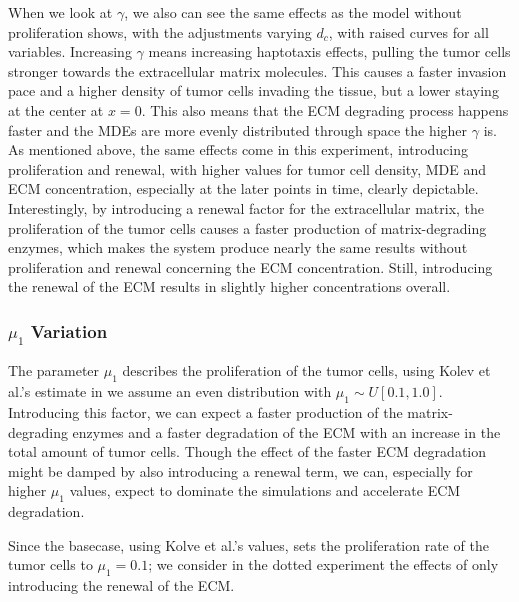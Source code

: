 When we look at $\gamma$, we also can see the same effects as the model without proliferation shows, with the adjustments varying $d_c$, with raised curves for all variables. Increasing $\gamma$ means increasing haptotaxis effects, pulling the tumor cells stronger towards the extracellular matrix molecules. This causes a faster invasion pace and a higher density of tumor cells invading the tissue, but a lower staying at the center at $x=0$. This also means that the ECM degrading process happens faster and the MDEs are more evenly distributed through space the higher $\gamma$ is. As mentioned above, the same effects come in this experiment, introducing proliferation and renewal, with higher values for tumor cell density, MDE and ECM concentration, especially at the later points in time, clearly depictable. Interestingly, by introducing a renewal factor for the extracellular matrix, the proliferation of the tumor cells causes a faster production of matrix-degrading enzymes, which makes the system produce nearly the same results without proliferation and renewal concerning the ECM concentration. Still, introducing the renewal of the ECM results in slightly higher concentrations overall.

\subsubsection*{$\mu_1$ Variation}
The parameter $\mu_1$ describes the proliferation of the tumor cells, using Kolev et al.'s estimate in \cite{Kolev2010} we assume an even distribution with $\mu_1 \sim U[0.1, 1.0]$. Introducing this factor, we can expect a faster production of the matrix-degrading enzymes and a faster degradation of the ECM with an increase in the total amount of tumor cells. Though the effect of the faster ECM degradation might be damped by also introducing a renewal term, we can, especially for higher $\mu_1$ values, expect to dominate the simulations and accelerate ECM degradation.

Since the basecase, using Kolve et al.'s values, sets the proliferation rate of the tumor cells to $\mu_1=0.1$; we consider in the dotted experiment the effects of only introducing the renewal of the ECM.

